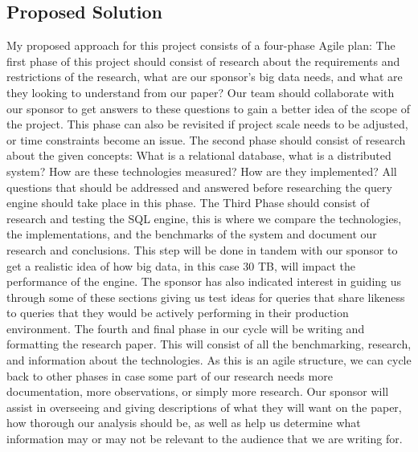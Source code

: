 \documentclass[letterpaper,10pt,fleqn,draftclsnofoot,onecolumn]{IEEEtran}
\begin{document}
	\subsection{\textbf{Proposed Solution}}
	\indent My proposed approach for this project consists of a four-phase Agile plan:
	The first phase of this project should consist of research about the requirements and restrictions of the research, what are our sponsor’s big data needs, and what are they looking to understand from our paper? Our team should collaborate with our sponsor to get answers to these questions to gain a better idea of the scope of the project. This phase can also be revisited if project scale needs to be adjusted, or time constraints become an issue.\newline\newline
	\indent The second phase should consist of research about the given concepts: What is a relational database, what is a distributed system? How are these technologies measured? How are they implemented? All questions that should be addressed and answered before researching the query engine should take place in this phase.\newline\newline
	\indent The Third Phase should consist of research and testing the SQL engine, this is where we compare the technologies, the implementations, and the benchmarks of the system and document our research and conclusions. This step will be done in tandem with our sponsor to get a realistic idea of how big data, in this case 30 TB, will impact the performance of the engine. The sponsor has also indicated interest in guiding us through some of these sections giving us test ideas for queries that share likeness to queries that they would be actively performing in their production environment.\newline\newline
	\indent The fourth and final phase in our cycle will be writing and formatting the research paper. This will consist of all the benchmarking, research, and information about the technologies. As this is an agile structure, we can cycle back to other phases in case some part of our research needs more documentation, more observations, or simply more research. Our sponsor will assist in overseeing and giving descriptions of what they will want on the paper, how thorough our analysis should be, as well as help us determine what information may or may not be relevant to the audience that we are writing for.
	
\end{document}
